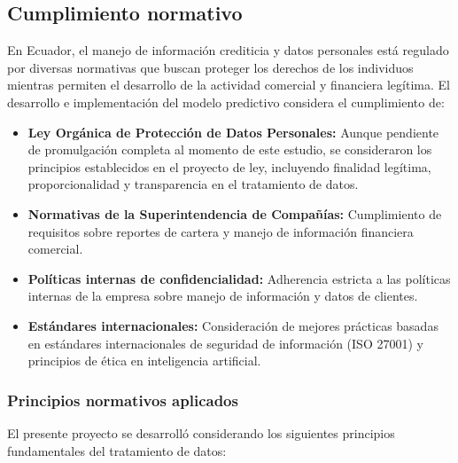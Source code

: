 \FloatBarrier
\subsection{Cumplimiento normativo}
En Ecuador, el manejo de información crediticia y datos personales está regulado por diversas normativas que buscan proteger los derechos de los individuos mientras permiten el desarrollo de la actividad comercial y financiera legítima. El desarrollo e implementación del modelo predictivo considera el cumplimiento de:

\begin{itemize}
    \item \textbf{Ley Orgánica de Protección de Datos Personales:} Aunque pendiente de promulgación completa al momento de este estudio, se consideraron los principios establecidos en el proyecto de ley, incluyendo finalidad legítima, proporcionalidad y transparencia en el tratamiento de datos.
    
    \item \textbf{Normativas de la Superintendencia de Compañías:} Cumplimiento de requisitos sobre reportes de cartera y manejo de información financiera comercial.
    
    \item \textbf{Políticas internas de confidencialidad:} Adherencia estricta a las políticas internas de la empresa sobre manejo de información y datos de clientes.
    
    \item \textbf{Estándares internacionales:} Consideración de mejores prácticas basadas en estándares internacionales de seguridad de información (ISO 27001) y principios de ética en inteligencia artificial.
\end{itemize}

\subsubsection{Principios normativos aplicados}
El presente proyecto se desarrolló considerando los siguientes principios fundamentales del tratamiento de datos:


